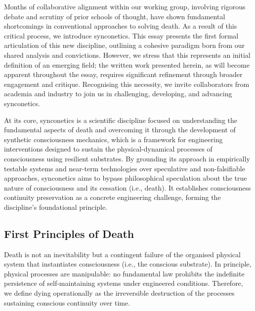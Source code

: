 \documentclass[10pt]{article}
\begin{document}
\begin{sloppypar}
  Months of collaborative alignment within our working group, involving rigorous debate and scrutiny of prior schools of thought, have shown fundamental shortcomings in conventional approaches to solving death. As a result of this critical process, we introduce synconetics. This essay presents the first formal articulation of this new discipline, outlining a cohesive paradigm born from our shared analysis and convictions. However, we stress that this represents an initial definition of an emerging field; the written work presented herein, as will become apparent throughout the essay, requires significant refinement through broader engagement and critique. Recognising this necessity, we invite collaborators from academia and industry to join us in challenging, developing, and advancing synconetics.

  At its core, synconetics is a scientific discipline focused on understanding the fundamental aspects of death and overcoming it through the development of synthetic consciousness mechanics, which is a framework for engineering interventions designed to sustain the physical-dynamical processes of consciousness using resilient substrates. By grounding its approach in empirically testable systems and near-term technologies over speculative and non-falsifiable approaches, synconetics aims to bypass philosophical speculation about the true nature of consciousness and its cessation (i.e., death). It establishes consciousness continuity preservation as a concrete engineering challenge, forming the discipline’s foundational principle.

  \subsection{First Principles of Death}
  \label{sec:first-principles}

  Death is not an inevitability but a contingent failure of the organised physical system that instantiates consciousness (i.e., the conscious substrate). In principle, physical processes are manipulable: no fundamental law prohibits the indefinite persistence of self-maintaining systems under engineered conditions. Therefore, we define dying operationally as the irreversible destruction of the processes sustaining conscious continuity over time.


\end{sloppypar}
\end{document}
